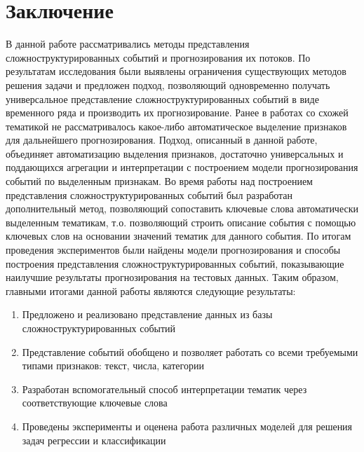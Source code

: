 \section{Заключение}
В данной работе рассматривались методы представления сложноструктурированных событий и прогнозирования их потоков. По результатам исследования были выявлены ограничения существующих методов решения задачи и предложен подход, позволяющий одновременно получать универсальное представление сложноструктурированных событий в виде временного ряда и производить их прогнозирование.
Ранее в работах со схожей тематикой не рассматривалось какое-либо автоматическое выделение признаков для дальнейшего прогнозирования. Подход, описанный в данной работе, объединяет автоматизацию выделения признаков, достаточно универсальных и поддающихся агрегации и интерпретации с построением модели прогнозирования событий по выделенным признакам.
Во время работы над построением представления сложноструктурированных событий был разработан дополнительный метод, позволяющий сопоставить ключевые слова автоматически выделенным тематикам, т.о. позволяющий строить описание события с помощью ключевых слов на основании значений тематик для данного события.
По итогам проведения экспериментов были найдены модели прогнозирования и способы построения представления сложноструктурированных событий, показывающие наилучшие результаты прогнозирования на тестовых данных.
Таким образом, главными итогами данной работы являются следующие результаты:
\begin{enumerate}
    \item Предложено и реализовано представление данных из базы сложноструктурированных событий
    \item Представление событий обобщено и позволяет работать со всеми требуемыми типами признаков: текст, числа, категории
    \item Разработан вспомогательный способ интерпретации тематик через соответствующие ключевые слова
    \item Проведены эксперименты и оценена работа различных моделей для решения задач регрессии и классификации

\end{enumerate}